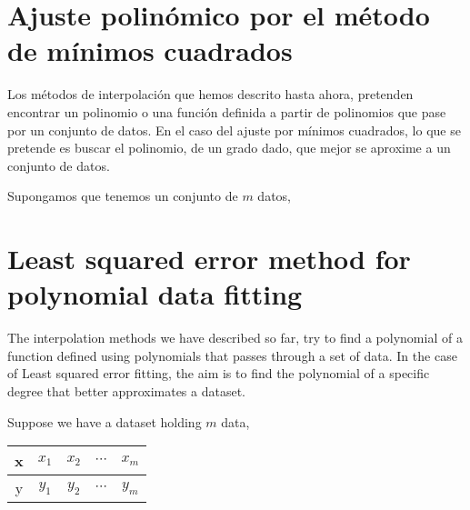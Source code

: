 \begin{paracol}{2}
\section{Ajuste polinómico por el método de mínimos cuadrados}\label{sec:mc} 

Los métodos de interpolación que hemos descrito hasta ahora, pretenden encontrar un polinomio o una función definida a partir de polinomios que pase por un conjunto de datos. En el caso del ajuste por mínimos cuadrados, lo que se pretende es buscar el polinomio, de un grado dado, que mejor se aproxime a un conjunto de datos.

Supongamos que tenemos un conjunto de $m$ datos,
\switchcolumn
 \section{Least squared error me\-thod for polynomial data fitting}
 
 The interpolation methods we have described so far, try to find a polynomial of a function defined using polynomials that passes through a set of data. In the case of Least squared error fitting, the aim is to find the polynomial of a specific degree that better approximates a dataset.
 
 Suppose we have a dataset holding $m$ data,        
\end{paracol}
\begin{table}[h]
\centering
\begin{tabular}{c|cccc}
x&$x_1$&$x_2$&$\cdots$&$x_m$\\
\hline
y&$y_1$&$y_2$&$\cdots$&$y_m$
\end{tabular}
\end{table} 
